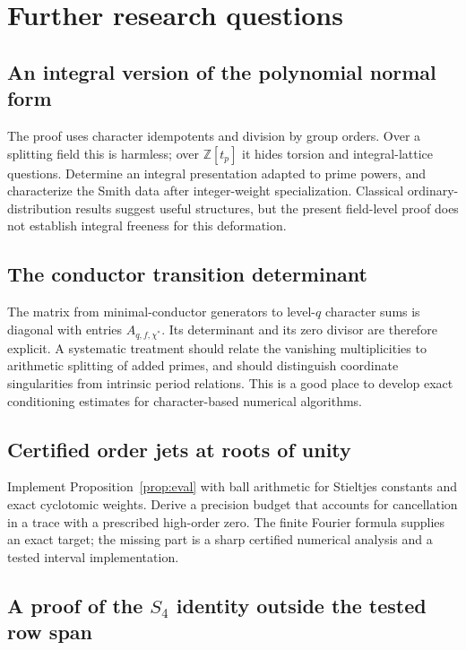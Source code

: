 \documentclass[11pt]{article}
\numberwithin{equation}{section}
\theoremstyle{definition}\newtheorem{definition}[theorem]{Definition}
\theoremstyle{remark}\newtheorem{remark}[theorem]{Remark}
\newcommand{\Z}{\mathbb Z}\newcommand{\U}{\mathcal U}
\newcommand{\ch}{\chi^*}
\begin{document}
\section{Further research questions}

\subsection{An integral version of the polynomial normal form}

The proof uses character idempotents and division by group orders. Over a
splitting field this is harmless; over $\Z[t_p]$ it hides torsion and
integral-lattice questions. Determine an integral presentation adapted to
prime powers, and characterize the Smith data after integer-weight
specialization. Classical ordinary-distribution results suggest useful
structures, but the present field-level proof does not establish integral
freeness for this deformation.

\subsection{The conductor transition determinant}

The matrix from minimal-conductor generators to level-$q$ character sums is
diagonal with entries $A_{q,f,\ch}$. Its determinant and its zero divisor
are therefore explicit. A systematic treatment should relate the vanishing
multiplicities to arithmetic splitting of added primes, and should distinguish
coordinate singularities from intrinsic period relations. This is a good
place to develop exact conditioning estimates for character-based numerical
algorithms.

\subsection{Certified order jets at roots of unity}

Implement Proposition~\ref{prop:eval} with ball arithmetic for Stieltjes
constants and exact cyclotomic weights. Derive a precision budget that
accounts for cancellation in a trace with a prescribed high-order zero.
The finite Fourier formula supplies an exact target; the missing part is
a sharp certified numerical analysis and a tested interval implementation.

\subsection{A proof of the \texorpdfstring{$S_4$}{S4} identity outside the tested row span}
\end{document}

